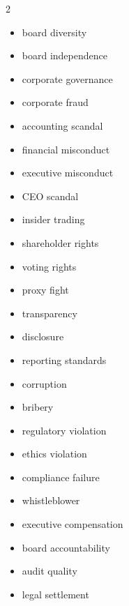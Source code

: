 \documentclass[12pt,a4paper]{article}
\begin{document}
\begin{multicols}{2}
\begin{itemize}[itemsep=0.2em]
    \item board diversity
    \item board independence
    \item corporate governance
    \item corporate fraud
    \item accounting scandal
    \item financial misconduct
    \item executive misconduct
    \item CEO scandal
    \item insider trading
    \item shareholder rights
    \item voting rights
    \item proxy fight
    \item transparency
    \item disclosure
    \item reporting standards
    \item corruption
    \item bribery
    \item regulatory violation
    \item ethics violation
    \item compliance failure
    \item whistleblower
    \item executive compensation
    \item board accountability
    \item audit quality
    \item legal settlement
\end{itemize}
\end{multicols}
\end{document}
